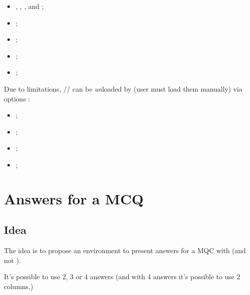 \documentclass[english,11pt,a4paper]{article}
\begin{document}
\begin{itemize}
	\item {}, , ,  and  ;
	\item {} ;
	\item {} ;
	\item {} ;
	\item {} ;
\end{itemize}

Due to limitations, // can be \textit{un}loaded by  (user must load them manually) via options :

\begin{itemize}
	\item {} ;
	\item {} ;
	\item {} ;
	\item {} ;
\end{itemize}

\begin{codehigh}[language=latex/latex3,style/main=teal!25,style/code=teal!25]
\usepackage{customenvs}

\usepackage[option(s)]{customenvs}
\end{codehigh}

\newpage

\section{Answers for a MCQ}

\subsection{Idea}

The idea is to propose an environment to present answers for a MQC with  (and not ).

\smallskip

It's possible to use 2, 3 or 4 answers (and with 4 answers it's possible to use 2 columns.)
\end{document}
